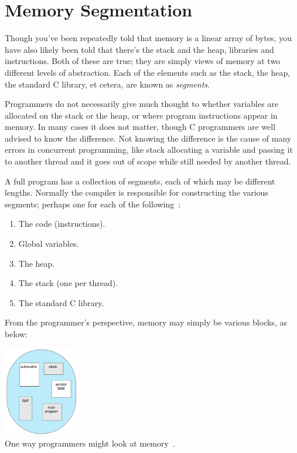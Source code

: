 




\section*{Memory Segmentation}

Though you've been repeatedly told that memory is a linear array of bytes, you have also likely been told that there's the stack and the heap, libraries and instructions. Both of these are true; they are simply views of memory at two different levels of abstraction. Each of the elements such as the stack, the heap, the standard C library, et cetera, are known as \textit{segments}.

Programmers do not necessarily give much thought to whether variables are allocated on the stack or the heap, or where program instructions appear in memory. In many cases it does not matter, though C programmers are well advised to know the difference. Not knowing the difference is the cause of many errors in concurrent programming, like stack allocating a variable and passing it to another thread and it goes out of scope while still needed by another thread.

A full program has a collection of segments, each of which may be different lengths. Normally the compiler is responsible for constructing the various segments; perhaps one for each of the following~\cite{osc}:

\begin{enumerate}
	\item The code (instructions).
	\item Global variables.
	\item The heap.
	\item The stack (one per thread).
	\item The standard C library.
\end{enumerate}

From the programmer's perspective, memory may simply be various blocks, as below:

\begin{center}
\includegraphics[width=0.25\textwidth]{images/segments.png}\\
One way programmers might look at memory~\cite{osc}.
\end{center}

